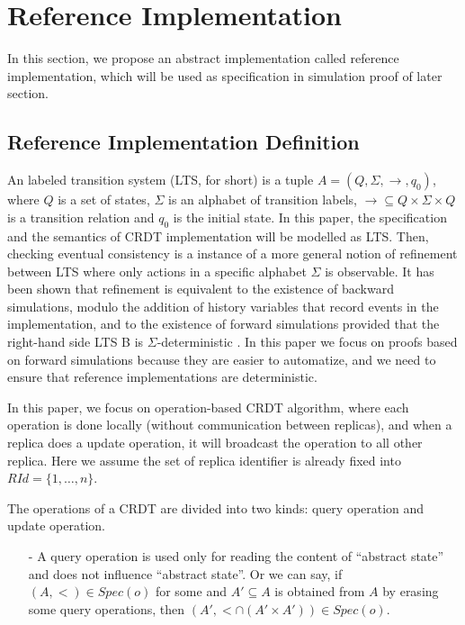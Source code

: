 \forget
{
\section{Reference Implementation}
\label{sec:reference implementation}

In this section, we propose an abstract implementation called reference implementation, which will be used as specification in simulation proof of later section.


\subsection{Reference Implementation Definition}
\label{subsec:reference implementation definition}

An labeled transition system (LTS, for short) is a tuple $A = (Q,\Sigma,\rightarrow,q_0)$, where $Q$ is a set of states, $\Sigma$ is an alphabet of transition labels, $\rightarrow \subseteq Q \times \Sigma \times Q$ is a transition relation and $q_0$ is the initial state. In this paper, the specification and the semantics of CRDT implementation will be modelled as LTS. Then, checking eventual consistency is a instance of a more general notion of refinement between LTS where only actions in a specific alphabet $\Sigma$ is observable. It has been shown that refinement is equivalent to the existence of backward simulations, modulo the addition of history variables that record events in the implementation, and to the existence of forward simulations provided that the right-hand side LTS B is $\Sigma$-deterministic \cite{Abadi:1991,Lynch:1995}. In this paper we focus on proofs based on forward simulations because they are easier to automatize, and we need to ensure that reference implementations are deterministic.

In this paper, we focus on operation-based CRDT algorithm, where each operation is done locally (without communication between replicas), and when a replica does a update operation, it will broadcast the operation to all other replica. Here we assume the set of replica identifier is already fixed into $RId=\{1,\ldots,n\}$.

The operations of a CRDT are divided into two kinds: query operation and update operation.

\begin{itemize}
\setlength{\itemsep}{0.5pt}
\item[-] A query operation is used only for reading the content of ``abstract state'' and does not influence ``abstract state''. Or we can say, if $(A,<) \in Spec(o)$ for some and $A' \subseteq A$ is obtained from $A$ by erasing some query operations, then $(A',< \cap (A' \times A')) \in Spec(o)$.


\end{itemize}}
